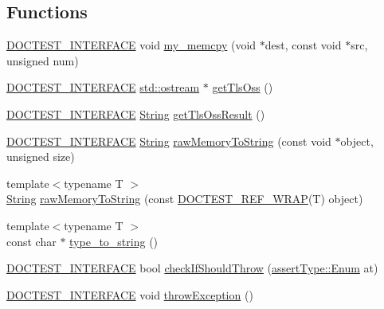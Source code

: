 \subsection*{Functions}
\begin{DoxyCompactItemize}
\item 
\hyperlink{doctest_8h_a9c16ffc635ec47f07797d21ede26b1a5}{D\+O\+C\+T\+E\+S\+T\+\_\+\+I\+N\+T\+E\+R\+F\+A\+CE} void \hyperlink{namespacedoctest_1_1detail_a4027cb5407ce2ff132645e89bba97010}{my\+\_\+memcpy} (void $\ast$dest, const void $\ast$src, unsigned num)
\item 
\hyperlink{doctest_8h_a9c16ffc635ec47f07797d21ede26b1a5}{D\+O\+C\+T\+E\+S\+T\+\_\+\+I\+N\+T\+E\+R\+F\+A\+CE} \hyperlink{doctest_8h_a116af65cb5e924b33ad9d9ecd7a783f3}{std\+::ostream} $\ast$ \hyperlink{namespacedoctest_1_1detail_a52299f4a981a01a3d3fe6e8d7518823d}{get\+Tls\+Oss} ()
\item 
\hyperlink{doctest_8h_a9c16ffc635ec47f07797d21ede26b1a5}{D\+O\+C\+T\+E\+S\+T\+\_\+\+I\+N\+T\+E\+R\+F\+A\+CE} \hyperlink{classdoctest_1_1_string}{String} \hyperlink{namespacedoctest_1_1detail_a7b0b3df5fe79d7ffa8fa138201476df1}{get\+Tls\+Oss\+Result} ()
\item 
\hyperlink{doctest_8h_a9c16ffc635ec47f07797d21ede26b1a5}{D\+O\+C\+T\+E\+S\+T\+\_\+\+I\+N\+T\+E\+R\+F\+A\+CE} \hyperlink{classdoctest_1_1_string}{String} \hyperlink{namespacedoctest_1_1detail_adb894f73b88fb3b39d6c48d80451f5ff}{raw\+Memory\+To\+String} (const void $\ast$object, unsigned size)
\item 
{\footnotesize template$<$typename T $>$ }\\\hyperlink{classdoctest_1_1_string}{String} \hyperlink{namespacedoctest_1_1detail_a28da75fd01ab3d943436aa69876b7151}{raw\+Memory\+To\+String} (const \hyperlink{doctest_8h_af2901cafb023c57fb672ccb1bf14f2eb}{D\+O\+C\+T\+E\+S\+T\+\_\+\+R\+E\+F\+\_\+\+W\+R\+AP}(T) object)
\item 
{\footnotesize template$<$typename T $>$ }\\const char $\ast$ \hyperlink{namespacedoctest_1_1detail_a8ad4f98867561d1ca7865874a2f82d7e}{type\+\_\+to\+\_\+string} ()
\item 
\hyperlink{doctest_8h_a9c16ffc635ec47f07797d21ede26b1a5}{D\+O\+C\+T\+E\+S\+T\+\_\+\+I\+N\+T\+E\+R\+F\+A\+CE} bool \hyperlink{namespacedoctest_1_1detail_acec9ff072dd86af95225a8beb9c57298}{check\+If\+Should\+Throw} (\hyperlink{namespacedoctest_1_1assert_type_ae1bb5bed722f34f1c38b83cb19d326d3}{assert\+Type\+::\+Enum} at)
\item 
\hyperlink{doctest_8h_a9c16ffc635ec47f07797d21ede26b1a5}{D\+O\+C\+T\+E\+S\+T\+\_\+\+I\+N\+T\+E\+R\+F\+A\+CE} void \hyperlink{namespacedoctest_1_1detail_a60ffd50b9ee7adfcafc078f333aac8b6}{throw\+Exception} ()

\end{DoxyCompactItemize}
